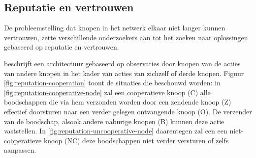 
\subsection{Reputatie en vertrouwen}
\label{subsection:reputation}

De probleemstelling dat knopen in het netwerk elkaar niet langer kunnen
vertrouwen, zette verschillende onderzoekers aan tot het zoeken naar
oplossingen gebaseerd op reputatie en vertrouwen.

\citep{ganeriwal2008reputation} beschrijft een architectuur gebaseerd op
observaties door knopen van de acties van andere knopen in het kader van acties
van zichzelf of derde knopen. Figuur \ref{fig:reputation-cooperation} toont de
situaties die beschouwd worden: in \ref{fig:reputation-cooperative-node} zal
een co\"operatieve knoop (C) alle boodschappen die via hem verzonden worden
door een zendende knoop (Z) effectief doorsturen naar een verder gelegen
ontvangende knoop (O). De verzender van de boodschap, alsook andere naburige
knopen (B) kunnen deze actie vaststellen. In
\ref{fig:reputation-uncooperative-node} daarentegen zal een een
niet-co\"operatieve knoop (NC) deze boodschappen niet verder versturen of zelfs
aanpassen.


